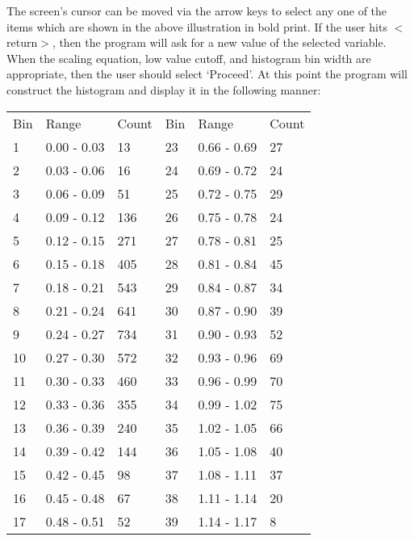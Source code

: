       The screen's cursor can be moved via the arrow keys to select any
   one of the items which are shown in the above illustration in bold
   print.  If the user hits $<$return$>$, then the program will ask for a new
   value of the selected variable.  When the scaling equation, low value
   cutoff, and histogram bin width are appropriate, then the user should
   select `Proceed'.  At this point the program will construct the
   histogram and display it in the following manner:
\begin{center}
\begin{tabular}{||l l l|l l l||}   
\hline

             Bin &   Range  &   Count &   Bin &   Range &    Count \\
              1 &  0.00 - 0.03  &   13 &  23 &  0.66 - 0.69  &   27  \\
              2 &  0.03 - 0.06  &   16 &  24 &  0.69 - 0.72  &   24  \\
              3 &  0.06 - 0.09  &   51 &  25 &  0.72 - 0.75  &   29  \\
              4 &  0.09 - 0.12  &  136 &  26 &  0.75 - 0.78  &   24  \\
              5 &  0.12 - 0.15  &  271 &  27 &  0.78 - 0.81  &   25  \\
              6 &  0.15 - 0.18  &  405 &  28 &  0.81 - 0.84  &   45  \\
              7 &  0.18 - 0.21  &  543 &  29 &  0.84 - 0.87  &   34  \\
              8 &  0.21 - 0.24  &  641 &  30 &  0.87 - 0.90  &   39  \\
              9 &  0.24 - 0.27  &  734 &  31 &  0.90 - 0.93  &   52  \\
             10 &  0.27 - 0.30  &  572 &  32 &  0.93 - 0.96  &   69 \\
             11 &  0.30 - 0.33  &  460 &  33 &  0.96 - 0.99  &   70 \\
             12 &  0.33 - 0.36  &  355 &  34 &  0.99 - 1.02  &   75 \\
             13 &  0.36 - 0.39  &  240 &  35 &  1.02 - 1.05  &   66 \\
             14 &  0.39 - 0.42  &  144 &  36 &  1.05 - 1.08  &   40 \\
             15 &  0.42 - 0.45  &   98 &  37 &  1.08 - 1.11  &   37 \\
             16 &  0.45 - 0.48  &   67 &  38 &  1.11 - 1.14  &   20 \\
             17 &  0.48 - 0.51  &   52 &  39 &  1.14 - 1.17  &    8 \\

\end{tabular}
\end{center}
